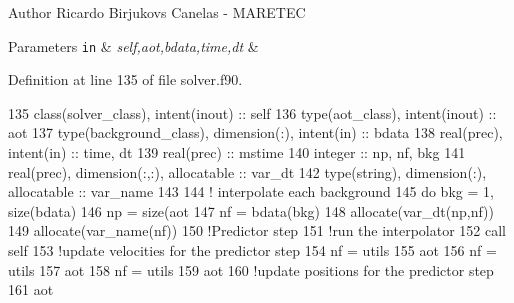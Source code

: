 \begin{DoxyAuthor}{Author}
Ricardo Birjukovs Canelas -\/ M\+A\+R\+E\+T\+EC 
\end{DoxyAuthor}

\begin{DoxyParams}[1]{Parameters}
\mbox{\tt in}  & {\em self,aot,bdata,time,dt} & \\
\hline
\end{DoxyParams}


Definition at line 135 of file solver.\+f90.


\begin{DoxyCode}
135     \textcolor{keywordtype}{class}(solver\_class), \textcolor{keywordtype}{intent(inout)} :: self
136     \textcolor{keywordtype}{type}(aot\_class), \textcolor{keywordtype}{intent(inout)} :: aot
137     \textcolor{keywordtype}{type}(background\_class), \textcolor{keywordtype}{dimension(:)}, \textcolor{keywordtype}{intent(in)} :: bdata
138     \textcolor{keywordtype}{real(prec)}, \textcolor{keywordtype}{intent(in)} :: time, dt
139     \textcolor{keywordtype}{real(prec)} :: mstime
140     \textcolor{keywordtype}{integer} :: np, nf, bkg
141     \textcolor{keywordtype}{real(prec)}, \textcolor{keywordtype}{dimension(:,:)}, \textcolor{keywordtype}{allocatable} :: var\_dt
142     \textcolor{keywordtype}{type}(string), \textcolor{keywordtype}{dimension(:)}, \textcolor{keywordtype}{allocatable} :: var\_name
143 
144     \textcolor{comment}{! interpolate each background}
145     \textcolor{keywordflow}{do} bkg = 1, \textcolor{keyword}{size}(bdata)
146         np = \textcolor{keyword}{size}(aot%
147         nf = bdata(bkg)%
148         \textcolor{keyword}{allocate}(var\_dt(np,nf))
149         \textcolor{keyword}{allocate}(var\_name(nf))
150         \textcolor{comment}{!Predictor step}
151         \textcolor{comment}{!run the interpolator}
152         \textcolor{keyword}{call }self%
153         \textcolor{comment}{!update velocities for the predictor step}
154         nf = utils%
155         aot%
156         nf = utils%
157         aot%
158         nf = utils%
159         aot%
160         \textcolor{comment}{!update positions for the predictor step}
161         aot%

\end{DoxyCode}
